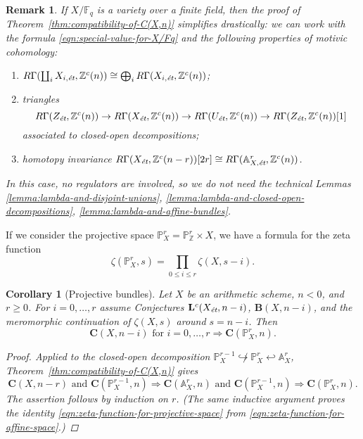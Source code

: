 \documentclass[10pt,a4paper,oneside,draft]{article}
\newcommand{\FF}{\mathbb{F}}
\newcommand{\ZZ}{\mathbb{Z}}
\renewcommand{\AA}{\mathbb{A}}
\newcommand{\PP}{\mathbb{P}}
\newcommand{\et}{\text{\it \'{e}t}}
\theoremstyle{myplain}
\newtheorem{corollary}[theorem]{Corollary}
\theoremstyle{mydefinition}
\newtheorem{remark}[theorem]{Remark}
\numberwithin{equation}{section}
\begin{document}
\begin{remark}
  If $X/\FF_q$ is a variety over a finite field, then the proof of
  Theorem~\ref{thm:compatibility-of-C(X,n)} simplifies drastically: we can work
  with the formula \eqref{eqn:special-value-for-X/Fq} and the following
  properties of motivic cohomology:
  \begin{enumerate}
  \item[1)] $R\Gamma (\coprod_i X_{i,\et}, \ZZ^c (n)) \cong
    \bigoplus_i R\Gamma (X_{i,\et}, \ZZ^c (n))$;

  \item[2)] triangles
    \[ R\Gamma (Z_\et, \ZZ^c (n)) \to
      R\Gamma (X_\et, \ZZ^c (n)) \to
      R\Gamma (U_\et, \ZZ^c (n)) \to
      R\Gamma (Z_\et, \ZZ^c (n))[1] \]
    associated to closed-open decompositions;

  \item[3)] homotopy invariance
    $R\Gamma (X_\et, \ZZ^c (n-r)) [2r] \cong
    R\Gamma (\AA^r_{X,\et}, \ZZ^c (n))$.
  \end{enumerate}
  In this case, no regulators are involved, so we do not need the technical
  Lemmas \ref{lemma:lambda-and-disjoint-unions},
  \ref{lemma:lambda-and-closed-open-decompositions},
  \ref{lemma:lambda-and-affine-bundles}.
\end{remark}

If we consider the projective space $\PP_X^r = \PP_\ZZ^r \times X$, we have a
formula for the zeta function
\begin{equation}
  \label{eqn:zeta-function-for-projective-space}
  \zeta (\PP_X^r, s) = \prod_{0 \le i \le r} \zeta (X, s-i).
\end{equation}

\begin{corollary}[Projective bundles]
  Let $X$ be an arithmetic scheme, $n < 0$, and $r \ge 0$.
  For $i = 0,\ldots,r$ assume Conjectures $\mathbf{L}^c (X_\et,n-i)$,
  $\mathbf{B} (X,n-i)$, and the meromorphic continuation of $\zeta (X,s)$ around
  $s = n-i$. Then
  \[ \mathbf{C} (X,n-i)\text{ for }i = 0,\ldots,r \Longrightarrow
    \mathbf{C} (\PP_X^r, n). \]

  \begin{proof}
    Applied to the closed-open decomposition
    $\PP_X^{r-1} \not\hookrightarrow \PP_X^r \hookleftarrow \AA_X^r$,
    Theorem~\ref{thm:compatibility-of-C(X,n)} gives
    \[ \mathbf{C} (X, n-r) \text{ and } \mathbf{C} (\PP_X^{r-1}, n)
      \Longrightarrow
      \mathbf{C} (\AA_X^r, n) \text{ and } \mathbf{C} (\PP_X^{r-1}, n)
      \Longrightarrow
      \mathbf{C} (\PP_X^r,n). \]
    The assertion follows by induction on $r$.
    (The same inductive argument proves the identity
    \eqref{eqn:zeta-function-for-projective-space} from
    \eqref{eqn:zeta-function-for-affine-space}.)
    \end{proof}
\end{corollary}
\end{document}
